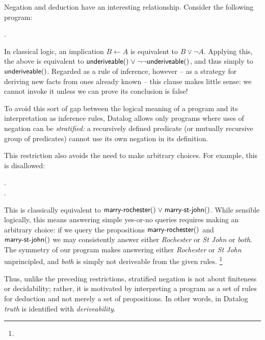 Negation and deduction have an interesting relationship.
%
Consider the following program:

\nopagebreak[1]
\begin{datalog}
   \gets \neg {}.
\end{datalog}

\noindent
In classical logic, an implication $B \gets A$ is equivalent to $B \vee \neg A$.
Applying this, the above is equivalent to $\atom{underiveable}{} \vee
\neg\neg\atom{underiveable}{}$, and thus simply to $\text{\sffamily underiveable}({})$.
%
Regarded as a rule of inference, however -- as a strategy for deriving new facts
from ones already known -- this clause makes little sense: we cannot invoke it
unless we can prove its conclusion is false!

To avoid this sort of gap between the logical meaning of a program and its
interpretation as inference rules, Datalog allows only programs where uses of
negation can be \emph{stratified:} a recursively defined predicate (or mutually
recursive group of predicates) cannot use its own negation in its definition.

This restriction also avoids the need to make arbitrary choices. For example,
this is disallowed:

\nopagebreak[1]
\begin{datalog}
   \gets \neg {}.\\
   \gets \neg {}.
\end{datalog}

This is classically equivalent to $\atom{marry-rochester}{} \vee
\atom{marry-st-john}{}$. While sensible logically, this means answering simple
yes-or-no queries requires making an arbitrary choice: if we query the
propositions $\text{\sffamily marry-rochester}({})$ and $\text{\sffamily marry-st-john}({})$ we
may consistently answer either \emph{Rochester} or \emph{St John} or
\emph{both}.
%
The symmetry of our program makes answering either
\emph{Rochester} or \emph{St John} unprincipled, and \emph{both} is simply
not deriveable from the given rules.%
%
\footnote{}

Thus, unlike the preceding restrictions, stratified negation is not about
finiteness or decidability; rather, it is motivated by interpreting a program
as a set of rules for deduction and not merely a set of propositions. In other
words, in Datalog \emph{truth} is identified with \emph{deriveability}.

